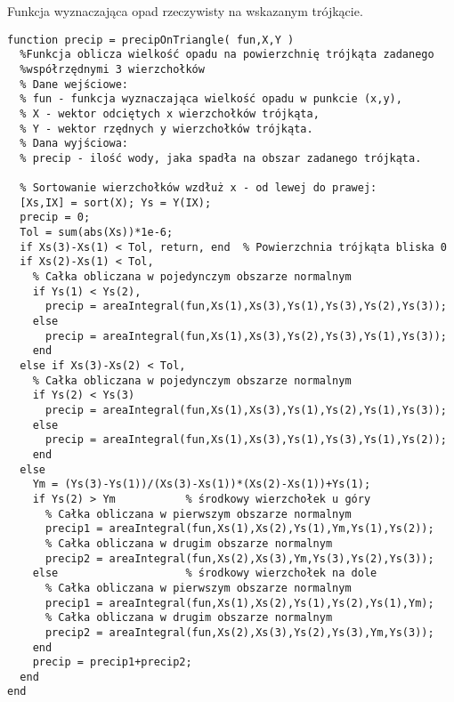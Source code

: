 Funkcja wyznaczająca opad rzeczywisty na wskazanym trójkącie.
\begin{lstlisting}
function precip = precipOnTriangle( fun,X,Y )
  %Funkcja oblicza wielkość opadu na powierzchnię trójkąta zadanego
  %współrzędnymi 3 wierzchołków
  % Dane wejściowe:
  % fun - funkcja wyznaczająca wielkość opadu w punkcie (x,y),
  % X - wektor odciętych x wierzchołków trójkąta,
  % Y - wektor rzędnych y wierzchołków trójkąta.
  % Dana wyjściowa:
  % precip - ilość wody, jaka spadła na obszar zadanego trójkąta.

  % Sortowanie wierzchołków wzdłuż x - od lewej do prawej:
  [Xs,IX] = sort(X); Ys = Y(IX);
  precip = 0;
  Tol = sum(abs(Xs))*1e-6; 
  if Xs(3)-Xs(1) < Tol, return, end  % Powierzchnia trójkąta bliska 0
  if Xs(2)-Xs(1) < Tol,
    % Całka obliczana w pojedynczym obszarze normalnym
    if Ys(1) < Ys(2),
      precip = areaIntegral(fun,Xs(1),Xs(3),Ys(1),Ys(3),Ys(2),Ys(3));
    else
      precip = areaIntegral(fun,Xs(1),Xs(3),Ys(2),Ys(3),Ys(1),Ys(3)); 
    end
  else if Xs(3)-Xs(2) < Tol,
    % Całka obliczana w pojedynczym obszarze normalnym
    if Ys(2) < Ys(3)
      precip = areaIntegral(fun,Xs(1),Xs(3),Ys(1),Ys(2),Ys(1),Ys(3));
    else
      precip = areaIntegral(fun,Xs(1),Xs(3),Ys(1),Ys(3),Ys(1),Ys(2));
    end
  else 
    Ym = (Ys(3)-Ys(1))/(Xs(3)-Xs(1))*(Xs(2)-Xs(1))+Ys(1);
    if Ys(2) > Ym           % środkowy wierzchołek u góry
      % Całka obliczana w pierwszym obszarze normalnym
      precip1 = areaIntegral(fun,Xs(1),Xs(2),Ys(1),Ym,Ys(1),Ys(2));    
      % Całka obliczana w drugim obszarze normalnym
      precip2 = areaIntegral(fun,Xs(2),Xs(3),Ym,Ys(3),Ys(2),Ys(3));
    else                    % środkowy wierzchołek na dole
      % Całka obliczana w pierwszym obszarze normalnym
      precip1 = areaIntegral(fun,Xs(1),Xs(2),Ys(1),Ys(2),Ys(1),Ym);    
      % Całka obliczana w drugim obszarze normalnym
      precip2 = areaIntegral(fun,Xs(2),Xs(3),Ys(2),Ys(3),Ym,Ys(3));
    end
    precip = precip1+precip2;
  end
end
\end{lstlisting}








